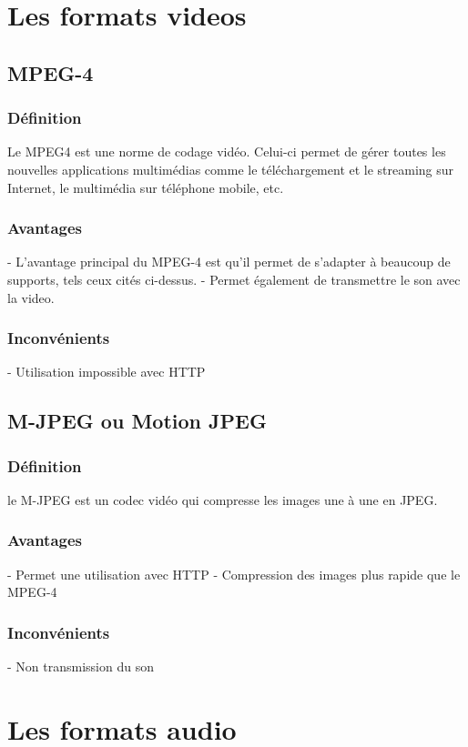 	\section{Les formats videos}
		\subsection{MPEG-4}
		\subsubsection{Définition}
		Le MPEG4 est une norme de codage vidéo. Celui-ci
		permet de gérer toutes les nouvelles applications multimédias comme le téléchargement et le
		streaming sur Internet, le multimédia sur téléphone mobile, etc.
		\subsubsection{Avantages}
		- L'avantage principal du MPEG-4 est qu'il permet de s'adapter à beaucoup de
		supports, tels ceux cités ci-dessus.
		- Permet également de transmettre le son avec la video.
		\subsubsection{Inconvénients}
		- Utilisation impossible avec HTTP
		
		\subsection{M-JPEG ou Motion JPEG}
		\subsubsection{Définition}
		le M-JPEG est un codec vidéo qui compresse les images une à une en JPEG.
		\subsubsection{Avantages}
		- Permet une utilisation avec HTTP
		- Compression des images plus rapide que le MPEG-4
		
		\subsubsection{Inconvénients}
		- Non transmission du son
		
	\section{Les formats audio}
